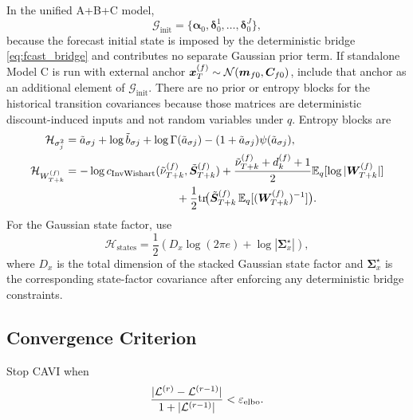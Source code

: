 In the unified A+B+C model,
\[
\mathcal G_{\mathrm{init}}=\{\bm\alpha_0,\bm\delta_0^1,\dots,\bm\delta_0^J\},
\]
because the forecast initial state is imposed by the deterministic bridge \eqref{eq:fcast_bridge}
and contributes no separate Gaussian prior term.
If standalone Model C is run with external anchor $\bm x_T^{(f)}\sim\mathcal{N}(\bm m_{f0},\bm C_{f0})$,
include that anchor as an additional element of $\mathcal G_{\mathrm{init}}$.
There are no prior or entropy blocks for the historical transition covariances because
those matrices are deterministic discount-induced inputs and not random variables under $q$.
Entropy blocks are
\begin{align}
\mathcal{H}_{\sigma_j^2}
&=
\tilde a_{\sigma j}+\log \tilde b_{\sigma j}+\log\Gamma(\tilde a_{\sigma j})
-(1+\tilde a_{\sigma j})\psi(\tilde a_{\sigma j}), \label{eq:elbo_entropy_sigma}\\
\mathcal{H}_{W_{T+k}^{(f)}}
&=
-\log c_{\IW}(\tilde\nu_{T+k}^{(f)},\tilde{\bm S}_{T+k}^{(f)})
+\frac{\tilde\nu_{T+k}^{(f)}+d_k^{(f)}+1}{2}\E_q[\log|\bm W_{T+k}^{(f)}|] \nonumber\\
&\hspace{10em}
+\frac12\tr\!\big(\tilde{\bm S}_{T+k}^{(f)}\,\E_q[(\bm W_{T+k}^{(f)})^{-1}]\big). \label{eq:elbo_entropy_W_fcast}
\end{align}
For the Gaussian state factor, use
\[
\mathcal{H}_{\text{states}}
=\frac12\left(D_x\log(2\pi e)+\log|\bm\Sigma_x^\star|\right),
\]
where $D_x$ is the total dimension of the stacked Gaussian state factor and
$\bm\Sigma_x^\star$ is the corresponding state-factor covariance after enforcing any deterministic
bridge constraints.

\subsection{Convergence Criterion}
Stop CAVI when
\begin{align}
\frac{|\mathcal{L}^{(r)}-\mathcal{L}^{(r-1)}|}{1+|\mathcal{L}^{(r-1)}|}<\varepsilon_{\text{elbo}}.
\label{eq:elbo_stop}
\end{align}

